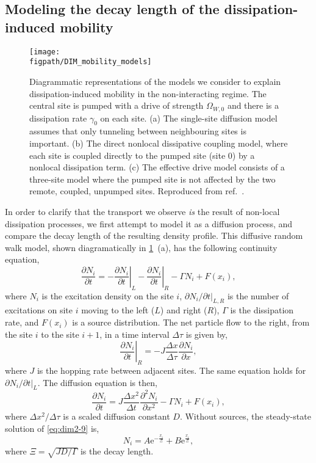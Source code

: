 \subsection{Modeling the decay length of the dissipation-induced mobility}
\begin{figure}[ht!]
\centering 
\texttt{[image: \\figpath/DIM\_mobility\_models]}
\caption{\label{fig:dim2-4}Diagrammatic representations of the models we consider to explain dissipation-induced mobility in the non-interacting regime. The central site is pumped with a drive of strength \(\Omega_{W,0}\) and there is a dissipation rate \(\gamma_{0}\) on each site. (a) The single-site diffusion model assumes that only tunneling between neighbouring sites is important. (b) The direct nonlocal dissipative coupling model, where each site is coupled directly to the pumped site (site 0) by a nonlocal dissipation term. (c) The effective drive model consists of a three-site model where the pumped site is not affected by the two remote, coupled, unpumped sites. Reproduced from ref.~\cite{Owen2017}.}
\end{figure}
In order to clarify that the transport we observe \emph{is} the result of non-local dissipation processes, we first attempt to model it as a diffusion process, and compare the decay length of the resulting density profile. This diffusive random walk model, shown diagramatically in \cref{fig:dim2-4}~(a), has the following continuity equation,
\begin{equation}
	\frac{\partial N_{i}}{\partial t} = - \left.\frac{\partial N_{i}}{\partial t}\right|_{L} - \left.\frac{\partial N_{i}}{\partial t}\right|_{R} - \Gamma N_{i} + F(x_{i}),
	\label{eq:dim2-7}
\end{equation}
where \(N_{i}\) is the excitation density on the site \(i\), \(\partial N_{i} / \partial t|_{L,R}\) is the number of excitations on site \(i\) moving to the left (\(L\)) and right (\(R\)), \(\Gamma\) is the dissipation rate, and \(F(x_{i})\) is a source distribution. The net particle flow to the right, from the site \(i\) to the site \(i+1\), in a time interval \(\Delta \tau\) is given by,
\begin{equation}
	\left.\frac{\partial N_{i}}{\partial t}\right|_{R} = -J\frac{\Delta x}{\Delta \tau}\frac{\partial N_{i}}{\partial x},
	\label{eq:dim2-8}
\end{equation}
where \(J\) is the hopping rate between adjacent sites. The same equation holds for \(\partial N_{i}/\partial t|_{L}\). The diffusion equation is then,
\begin{equation}
	\frac{\partial N_{i}}{\partial t} = J\frac{\Delta x^{2}}{\Delta t}\frac{\partial^{2} N_{i}}{\partial x^{2}} - \Gamma N_{i} + F(x_{i}),	
	\label{eq:dim2-9}
\end{equation}
where \(\Delta x^{2}/\Delta \tau\) is a scaled diffusion constant \(D\). Without sources, the steady-state solution of \cref{eq:dim2-9} is,
\begin{equation}
	N_{i} = A\mathrm{e}^{-\frac{x_{i}}{\Xi}} + B\mathrm{e}^{\frac{x_{i}}{\Xi}},
	\label{eq:dim2-10}
\end{equation}
where \(\Xi = \sqrt{JD/\Gamma}\) is the decay length.

